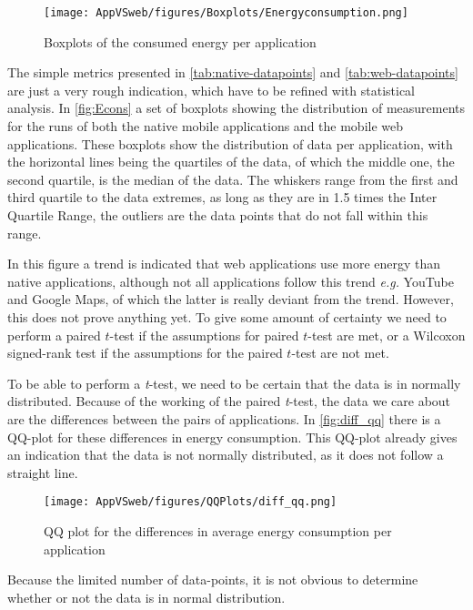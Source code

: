 \begin{figure*}[bt]
    \centering
    \texttt{[image: AppVSweb/figures/Boxplots/Energyconsumption.png]}
    \caption{Boxplots of the consumed energy per application}
    \label{fig:Econs}
\end{figure*}

The simple metrics presented in \autoref{tab:native-datapoints} and \ref{tab:web-datapoints} are just a very rough indication, which have to be refined with statistical analysis. In \autoref{fig:Econs} a set of boxplots showing the distribution of measurements for the runs of both the native mobile applications and the mobile web applications. These boxplots show the distribution of data per application, with the horizontal lines being the quartiles of the data, of which the middle one, the second quartile, is the median of the data. The whiskers range from the first and third quartile to the data extremes, as long as they are in 1.5 times the Inter Quartile Range, the outliers are the data points that do not fall within this range.

In this figure a trend is indicated that web applications use more energy than native applications, although not all applications follow this trend \textit{e.g.} YouTube and Google Maps, of which the latter is really deviant from the trend. However, this does not prove anything yet. To give some amount of certainty we need to perform a paired $t$-test if the assumptions for paired $t$-test are met, or a Wilcoxon signed-rank test if the assumptions for the paired $t$-test are not met.

To be able to perform a \textit{t}-test, we need to be certain that the data is in normally distributed. Because of the working of the paired \textit{t}-test, the data we care about are the differences between the pairs of applications. In \autoref{fig:diff_qq} there is a QQ-plot for these differences in energy consumption. This QQ-plot already gives an indication that the data is not normally distributed, as it does not follow a straight line.
\begin{figure}[t]
    \centering
    \texttt{[image: AppVSweb/figures/QQPlots/diff\_qq.png]}
    \caption{QQ plot for the differences in average energy consumption per application}
    \label{fig:diff_qq}
\end{figure}
Because the limited number of data-points, it is not obvious to determine whether or not the data is in normal distribution.

